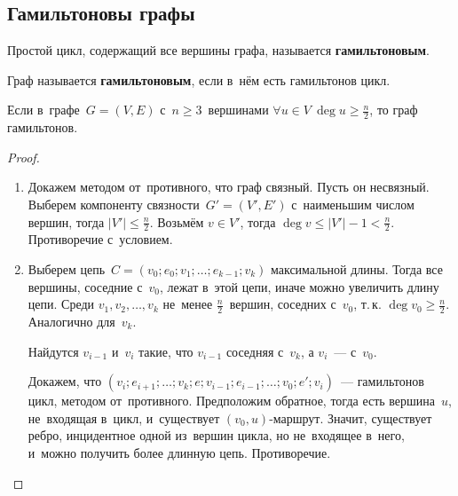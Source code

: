 \subsection{Гамильтоновы графы}
Простой цикл, содержащий все вершины графа, называется \textbf{гамильтоновым}.

Граф называется \textbf{гамильтоновым}, если в~нём есть гамильтонов цикл.

\begin{theorem}[Дирака]
\label{th:Dirac}
Если в~графе~$G = (V, E)$ с~$n \geqslant 3$~вершинами $\forall u \in V \ \deg u \geqslant \frac{n}2$, то граф гамильтонов.
\end{theorem}
\begin{proof}
\begin{enumerate}
	\item Докажем методом от~противного, что граф связный.
	Пусть он несвязный.
	Выберем компоненту связности~$G' = (V', E')$ с~наименьшим числом вершин, тогда $|V'| \leqslant \frac{n}2$.
	Возьмём $v \in V'$, тогда $\deg v \leqslant |V'| - 1 < \frac{n}2$.
	Противоречие с~условием.
	\item Выберем цепь~$C = (v_0; e_0; v_1; \ldots; e_{k-1}; v_k)$ максимальной длины.
	Тогда все вершины, соседние с~$v_0$, лежат в~этой цепи, иначе можно увеличить длину цепи.
	Среди $v_1, v_2, \ldots, v_k$ не~менее $\frac{n}2$~вершин, соседних с~$v_0$, т.\,к. $\deg v_0 \geqslant \frac{n}2$.
	Аналогично для~$v_k$.
	
	Найдутся $v_{i-1}$ и~$v_i$ такие, что $v_{i-1}$ соседняя с~$v_k$, а $v_i$~--- с~$v_0$.
	
	Докажем, что $(v_i; e_{i+1}; \ldots; v_k; e; v_{i-1}; e_{i-1}; \ldots; v_0; e'; v_i)$~--- гамильтонов цикл, методом от~противного.
	Предположим обратное, тогда есть вершина~$u$, не~входящая в~цикл, и~существует $(v_0, u)$\nobreakdash-\hspace{0pt}маршрут.
	Значит, существует ребро, инцидентное одной из~вершин цикла, но не~входящее в~него, и~можно получить более длинную цепь.
	Противоречие.
\end{enumerate}
\end{proof}

